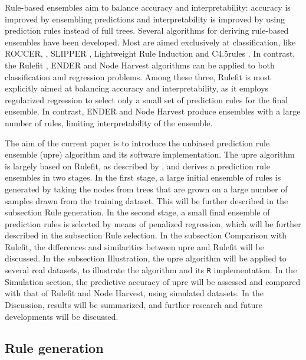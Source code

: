 \documentclass[nobf,doc]{apa}
\begin{document}
Rule-based ensembles aim to balance accuracy and interpretability: accuracy is improved by ensembling predictions and interpretability is improved by using prediction rules instead of full trees. Several algorithms for deriving rule-based ensembles have been developed. Most are aimed exclusively at classification, like ROCCER, \cite{PratyFlac05}, SLIPPER \cite{CoheySing99}, Lightweight Rule Induction \cite{WeisyIndu00} and C4.5rules \cite{Quin14}. In contrast, the Rulefit \cite{FrieyPope08}, ENDER \cite{DembyKotl10} and Node Harvest \cite{Mein10} algorithms can be applied to both classification and regression problems. Among these three, Rulefit is most explicitly aimed at balancing accuracy and interpretability, as it employs regularized regression to select only a small set of prediction rules for the final ensemble. In contrast, ENDER and Node Harvest produce ensembles with a large number of rules, limiting interpretability of the ensemble. 

The aim of the current paper is to introduce the unbiased prediction rule ensemble (upre) algorithm and its software implementation. The upre algorithm is largely based on Rulefit, as described by \cite{FrieyPope08}, and derives a prediction rule ensembles in two stages. In the first stage, a large initial ensemble of rules is generated by taking the nodes from trees that are grown on a large number of samples drawn from the training dataset. This will be further described in the subsection Rule generation. In the second stage, a small final ensemble of prediction rules is selected by means of penalized regression, which will be further described in the subsection Rule selection. In the subsection Comparison with Rulefit, the differences and similarities between upre and Rulefit will be discussed. In the subsection Illustration, the upre algorithm will be applied to several real datasets, to illustrate the algorithm and its \verb|R| implementation. In the Simulation section, the predictive accuracy of upre will be assessed and compared with that of Rulefit and Node Harvest, using simulated datasets. In the Discussion, results will be summarized, and further research and future developments will be discussed.   




\subsection{Rule generation}
\end{document}
